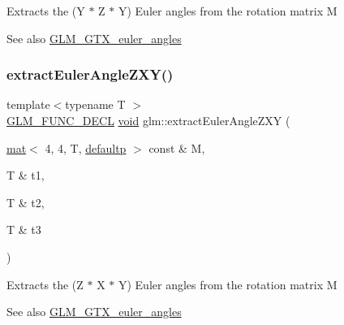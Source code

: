 Extracts the (Y $\ast$ Z $\ast$ Y) Euler angles from the rotation matrix M \begin{DoxySeeAlso}{See also}
\mbox{\hyperlink{group__gtx__euler__angles}{G\+L\+M\+\_\+\+G\+T\+X\+\_\+euler\+\_\+angles}} 
\end{DoxySeeAlso}
\mbox{\label{group__gtx__euler__angles_ga81fbbca2ba0c778b9662d5355b4e2363}} 
\subsubsection{\texorpdfstring{extract\+Euler\+Angle\+Z\+X\+Y()}{extractEulerAngleZXY()}}
{\footnotesize\ttfamily template$<$typename T $>$ \\
\mbox{\hyperlink{setup_8hpp_ab2d052de21a70539923e9bcbf6e83a51}{G\+L\+M\+\_\+\+F\+U\+N\+C\+\_\+\+D\+E\+CL}} \mbox{\hyperlink{_s_d_l__opengles2__gl2ext_8h_ae5d8fa23ad07c48bb609509eae494c95}{void}} glm\+::extract\+Euler\+Angle\+Z\+XY (\begin{DoxyParamCaption}\item[{\mbox{\hyperlink{structglm_1_1mat}{mat}}$<$ 4, 4, T, \mbox{\hyperlink{namespaceglm_a36ed105b07c7746804d7fdc7cc90ff25a9d21ccd8b5a009ec7eb7677befc3bf51}{defaultp}} $>$ const \&}]{M,  }\item[{T \&}]{t1,  }\item[{T \&}]{t2,  }\item[{T \&}]{t3 }\end{DoxyParamCaption})}

Extracts the (Z $\ast$ X $\ast$ Y) Euler angles from the rotation matrix M \begin{DoxySeeAlso}{See also}
\mbox{\hyperlink{group__gtx__euler__angles}{G\+L\+M\+\_\+\+G\+T\+X\+\_\+euler\+\_\+angles}} 
\end{DoxySeeAlso}
\mbox{\label{group__gtx__euler__angles_ga59359fef9bad92afaca55e193f91e702}} 
